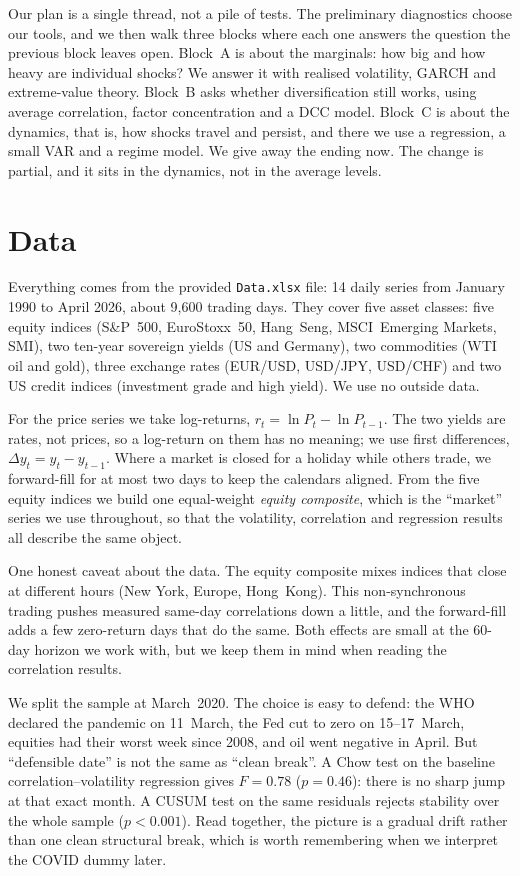 \documentclass[11pt,a4paper]{article}
\begin{document}
Our plan is a single thread, not a pile of tests. The preliminary diagnostics choose our tools, and we
then walk three blocks where each one answers the question the previous block leaves open. Block~A is
about the marginals: how big and how heavy are individual shocks? We answer it with realised volatility,
GARCH and extreme-value theory. Block~B asks whether diversification still works, using average
correlation, factor concentration and a DCC model. Block~C is about the dynamics, that is, how shocks
travel and persist, and there we use a regression, a small VAR and a regime model. We give away the
ending now. The change is partial, and it sits in the dynamics, not in the average levels.

% 
\section{Data}
% 

Everything comes from the provided \texttt{Data.xlsx} file: 14 daily series from January 1990 to April
2026, about 9{,}600 trading days. They cover five asset classes: five equity indices (S\&P~500,
EuroStoxx~50, Hang~Seng, MSCI~Emerging Markets, SMI), two ten-year sovereign yields (US and Germany),
two commodities (WTI oil and gold), three exchange rates (EUR/USD, USD/JPY, USD/CHF) and two US credit
indices (investment grade and high yield). We use no outside data.

For the price series we take log-returns, $r_t = \ln P_t - \ln P_{t-1}$. The two yields are rates, not
prices, so a log-return on them has no meaning; we use first differences, $\Delta y_t = y_t - y_{t-1}$.
Where a market is closed for a holiday while others trade, we forward-fill for at most two days to keep
the calendars aligned. From the five equity indices we build one equal-weight \emph{equity composite},
which is the ``market'' series we use throughout, so that the volatility, correlation and regression
results all describe the same object.

One honest caveat about the data. The equity composite mixes indices that close at different hours
(New York, Europe, Hong~Kong). This non-synchronous trading pushes measured same-day correlations down a
little, and the forward-fill adds a few zero-return days that do the same. Both effects are small at the
60-day horizon we work with, but we keep them in mind when reading the correlation results.

We split the sample at March~2020. The choice is easy to defend: the WHO declared the pandemic on
11~March, the Fed cut to zero on 15--17~March, equities had their worst week since 2008, and oil went
negative in April. But ``defensible date'' is not the same as ``clean break''. A Chow test on the
baseline correlation--volatility regression gives $F=0.78$ ($p=0.46$): there is no sharp jump at that
exact month. A CUSUM test on the same residuals rejects stability over the whole sample ($p<0.001$). Read
together, the picture is a gradual drift rather than one clean structural break, which is worth
remembering when we interpret the COVID dummy later.
\end{document}
